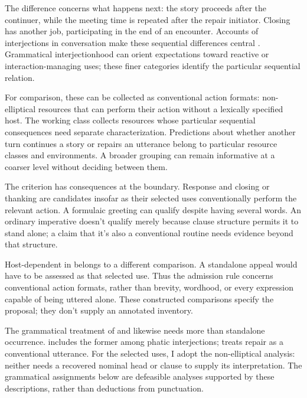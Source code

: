 \documentclass[12pt]{article}
\begin{document}
The difference concerns what happens next: the story proceeds after
the continuer, while the meeting time is repeated after the repair
initiator. Closing  has another job, participating in the
end of an encounter. Accounts of interjections in conversation make
these sequential differences central \citep[257--259, 263--265]{dingemanse2024}.
Grammatical interjectionhood can orient expectations toward reactive or
interaction-managing uses; these finer categories identify the particular
sequential relation.

For comparison, these can be collected as conventional action formats:
non-elliptical resources that can perform their action without a lexically
specified host. The working class collects resources whose particular sequential
consequences need separate characterization. Predictions about whether
another turn continues a story or repairs an utterance belong to
particular resource classes and environments. A broader grouping can
remain informative at a coarser level without deciding between them.

The criterion has consequences at the boundary. Response 
and closing or thanking  are candidates insofar as their
selected uses conventionally perform the relevant action. A formulaic
greeting  can qualify despite having several words.
An ordinary imperative  doesn't qualify merely because
clause structure permits it to stand alone; a claim that it's also a
conventional routine needs evidence beyond that structure.

Host-dependent  in  belongs to
a different comparison. A standalone appeal  would have
to be assessed as that selected use. Thus the admission rule concerns
conventional action formats, rather than brevity, wordhood, or every
expression capable of being uttered alone. These constructed comparisons
specify the proposal; they don't supply an annotated inventory.

The grammatical treatment of  and  likewise
needs more than standalone occurrence. \textcite[114]{ameka1992} includes the former among
phatic interjections; \textcite[152]{wilkins1992} treats repair 
as a conventional utterance.
For the selected uses, I adopt the non-elliptical analysis: neither needs
a recovered nominal head or clause to supply its interpretation.
The grammatical assignments below are defeasible analyses supported by
these descriptions, rather than deductions from punctuation.
\end{document}
